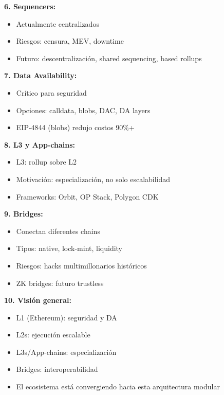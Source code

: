 \documentclass[11pt,a4paper,twoside,openright]{book}
\theoremstyle{definition}
\theoremstyle{plain}
\theoremstyle{remark}
\begin{document}
\begin{keyidea}
\textbf{6. Sequencers:}
\begin{itemize}
    \item Actualmente centralizados
    \item Riesgos: censura, MEV, downtime
    \item Futuro: descentralización, shared sequencing, based rollups
\end{itemize}

\textbf{7. Data Availability:}
\begin{itemize}
    \item Crítico para seguridad
    \item Opciones: calldata, blobs, DAC, DA layers
    \item EIP-4844 (blobs) redujo costos 90\%+
\end{itemize}

\textbf{8. L3 y App-chains:}
\begin{itemize}
    \item L3: rollup sobre L2
    \item Motivación: especialización, no solo escalabilidad
    \item Frameworks: Orbit, OP Stack, Polygon CDK
\end{itemize}

\textbf{9. Bridges:}
\begin{itemize}
    \item Conectan diferentes chains
    \item Tipos: native, lock-mint, liquidity
    \item Riesgos: hacks multimillonarios históricos
    \item ZK bridges: futuro trustless
\end{itemize}

\textbf{10. Visión general:}
\begin{itemize}
    \item L1 (Ethereum): seguridad y DA
    \item L2s: ejecución escalable
    \item L3s/App-chains: especialización
    \item Bridges: interoperabilidad
    \item El ecosistema está convergiendo hacia esta arquitectura modular
\end{itemize}
\end{keyidea}

\cleardoublepage
\end{document}
